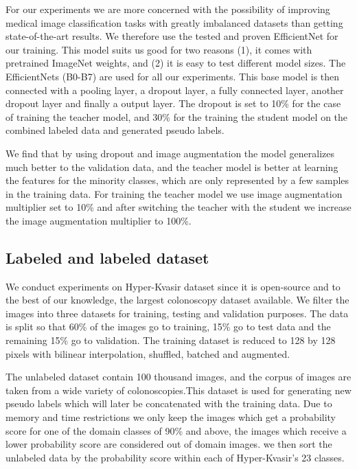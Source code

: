 \documentclass[thesis.tex]{subfiles}
\begin{document}
For our experiments we are more concerned with the possibility of improving medical image classification tasks with greatly imbalanced datasets than getting state-of-the-art results. We therefore use the tested and proven EfficientNet for our training. This model suits us good for two reasons (1), it comes with pretrained ImageNet weights, and (2) it is easy to test different model sizes. The EfficientNets (B0-B7) are used for all our experiments. This base model is then connected with a pooling layer, a dropout layer, a fully connected layer, another dropout layer and finally a output layer. The dropout is set to 10\% for the case of training the teacher model, and 30\% for the training the student model on the combined labeled data and generated pseudo labels. 

We find that by using dropout and image augmentation the model generalizes much better to the validation data, and the teacher model is better at learning the features for the minority classes, which are only represented by a few samples in the training data. For training the teacher model we use image augmentation multiplier set to 10\% and after switching the teacher with the student we increase the image augmentation multiplier to 100\%.



\subsection{Labeled and labeled dataset}
We conduct experiments on Hyper-Kvasir dataset since it is open-source and to the best of our knowledge, the largest colonoscopy dataset available. We filter the images into three datasets for training, testing and validation purposes. The data is split so that 60\% of the images go to training, 15\% go to test data and the remaining 15\% go to validation. The training dataset is reduced to 128 by 128 pixels with bilinear interpolation, shuffled, batched and augmented.

The unlabeled dataset contain 100 thousand images, and the corpus of images are taken from a wide variety of colonoscopies.This dataset is used for generating new pseudo labels which will later be concatenated with the training data. Due to memory and time restrictions we only keep the images which get a probability score for one of the domain classes of 90\% and above, the images which receive a lower probability score are considered out of domain images. we then sort the unlabeled data by the probability score within each of Hyper-Kvasir's 23 classes.
\end{document}
